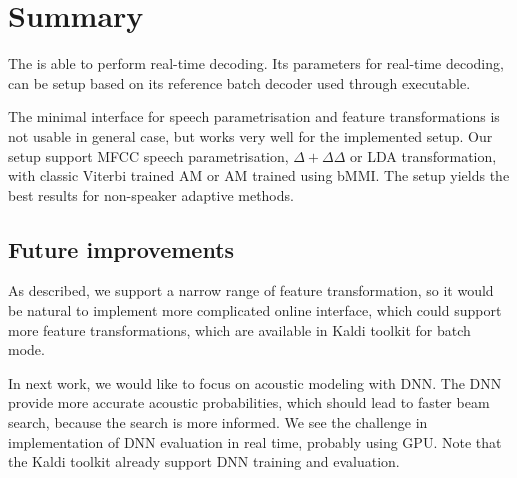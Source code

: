 \section{Summary}
\label{sec:onl_summary}
The \/ is able to perform real-time decoding.
Its parameters for real-time decoding, 
can be setup based on its reference batch decoder \/ used through \/ executable.

The minimal interface for speech parametrisation and feature transformations is not usable in general case,
but works very well for the implemented setup.
Our setup support \ac{MFCC} speech parametrisation, $\Delta+\Delta\Delta$ or \ac{LDA} transformation, with
classic Viterbi trained \ac{AM} or \ac{AM} trained using \ac{bMMI}.
The setup yields the best results for non-speaker adaptive methods.



\subsection{Future improvements}
\label{sub:onl_future}
As described, we support a narrow range of feature transformation,
so it would be natural to implement more complicated online interface,
which could support more feature transformations, 
which are available in Kaldi toolkit for batch mode. 

In next work, we would like to focus on acoustic modeling with \acl{DNN}.
The \ac{DNN} provide more accurate acoustic probabilities, 
which should lead to faster beam search,
because the search is more informed.\cite{TODO_DNN} 
We see the challenge in implementation of \acl{DNN} evaluation in real time, probably using \ac{GPU}.
Note that the Kaldi toolkit already support \ac{DNN} training and evaluation.
